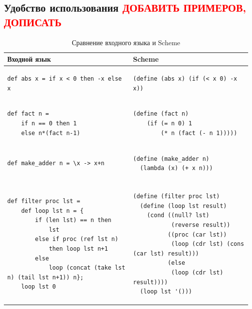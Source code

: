 \documentclass[12pt,a4paper,oneside]{extarticle}
\begin{document}
    \subsection{Удобство использования \textcolor{red}{ДОБАВИТЬ ПРИМЕРОВ, ДОПИСАТЬ}}
        \begin{table}[h!]
            \label{tabular:syntax}
            \centering        
            \begin{tabular}{|l|l|}
                \hline
                \textbf{Входной язык} & \textbf{Scheme}
                \\ \hline
                    \begin{lstlisting}
def abs x = if x < 0 then -x else x
                    \end{lstlisting} &
                    \begin{lstlisting}
(define (abs x) (if (< x 0) -x x))
                    \end{lstlisting}
                \\ \hline
                    \begin{lstlisting}
def fact n = 
    if n == 0 then 1
    else n*(fact n-1)
                    \end{lstlisting} &
                    \begin{lstlisting}
(define (fact n)
    (if (= n 0) 1
        (* n (fact (- n 1)))))
                    \end{lstlisting}
                \\ \hline
                    \begin{lstlisting}
def make_adder n = \x -> x+n
                    \end{lstlisting} &
                    \begin{lstlisting}
(define (make_adder n) 
  (lambda (x) (+ x n)))
                    \end{lstlisting}
                \\ \hline
                \\ \hline
                    \begin{lstlisting}
def filter proc lst = 
    def loop lst n = {
        if (len lst) == n then 
            lst
        else if proc (ref lst n) 
            then loop lst n+1
        else 
            loop (concat (take lst n) (tail lst n+1)) n};
    loop lst 0
                    \end{lstlisting} &
                    \begin{lstlisting}
(define (filter proc lst)
  (define (loop lst result)
    (cond ((null? lst) 
           (reverse result))
          ((proc (car lst)) 
           (loop (cdr lst) (cons (car lst) result)))
          (else 
           (loop (cdr lst) result))))
  (loop lst '()))
                    \end{lstlisting}
                \\ \hline
            \end{tabular}
        \caption{Сравнение входного языка и Scheme}
        \end{table}
\end{document}
